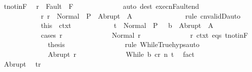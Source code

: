\begin{isabellebody}
\ t{\isacharunderscore}notin{\isacharunderscore}F\ \isamarkupfalse%
\ {\isachardoublequoteopen}r\ {\isasymnotin}\ Fault\ {\isacharbackquote}\ F{\isachardoublequoteclose}\isanewline
\ \ \ \ \ \ \ \ \ \ \ \ \isamarkupfalse%
\ {\isacharparenleft}auto\ dest{\isacharcolon}\ execn{\isacharunderscore}Fault{\isacharunderscore}end{\isacharparenright}\isanewline
\ \ \ \ \ \ \ \ \ \ \isamarkupfalse%
\isanewline
\ \ \ \ \ \ \ \ \ \ \isamarkupfalse%
\ r{\isacharcolon}\ {\isachardoublequoteopen}r\ {\isasymin}\ Normal\ {\isacharbackquote}\ P\ {\isasymunion}\ Abrupt\ {\isacharbackquote}\ A{\isachardoublequoteclose}\isanewline
\ \ \ \ \ \ \ \ \ \ \ \ \isamarkupfalse%
\ {\isacharminus}\ {\isacharparenleft}rule\ cnvalidD{\isacharcomma}auto{\isacharparenright}\isanewline
\ \ \ \ \ \ \ \ \ \ \isamarkupfalse%
\ this\ {\isacharunderscore}\ ctxt\isanewline
\ \ \ \ \ \ \ \ \ \ \isamarkupfalse%
\ {\isachardoublequoteopen}t\ {\isasymin}\ Normal\ {\isacharbackquote}\ {\isacharparenleft}P\ {\isasyminter}\ {\isacharminus}\ b{\isacharparenright}\ {\isasymunion}\ Abrupt\ {\isacharbackquote}\ A\ {\isachardoublequoteclose}\isanewline
\ \ \ \ \ \ \ \ \ \ \isamarkupfalse%
\ {\isacharparenleft}cases\ r{\isacharparenright}\isanewline
\ \ \ \ \ \ \ \ \ \ \ \ \isamarkupfalse%
\ {\isacharparenleft}Normal\ r{\isacharprime}{\isacharparenright}\isanewline
\ \ \ \ \ \ \ \ \ \ \ \ \isamarkupfalse%
\ r\ ctxt\ eqs\ t{\isacharunderscore}notin{\isacharunderscore}F\isanewline
\ \ \ \ \ \ \ \ \ \ \ \ \isamarkupfalse%
\ {\isacharquery}thesis\isanewline
\ \ \ \ \ \ \ \ \ \ \ \ \ \ \isamarkupfalse%
\ {\isacharminus}\ {\isacharparenleft}rule\ WhileTrue{\isachardot}hyps{\isacharcomma}auto{\isacharparenright}\isanewline
\ \ \ \ \ \ \ \ \ \ \isamarkupfalse%
\isanewline
\ \ \ \ \ \ \ \ \ \ \ \ \isamarkupfalse%
\ {\isacharparenleft}Abrupt\ r{\isacharprime}{\isacharparenright}\isanewline
\ \ \ \ \ \ \ \ \ \ \ \ \isamarkupfalse%
\ {\isachardoublequoteopen}{\isasymGamma}{\isasymturnstile}{\isasymlangle}While\ b{\isacharprime}\ c{\isacharprime}{\isacharcomma}r{\isasymrangle}\ {\isacharequal}n{\isasymRightarrow}\ t{\isachardoublequoteclose}\ \isamarkupfalse%
\ fact\isanewline
\ \ \ \ \ \ \ \ \ \ \ \ \isamarkupfalse%
\ Abrupt\ \isamarkupfalse%
\ {\isachardoublequoteopen}t{\isacharequal}r{\isachardoublequoteclose}\isanewline

\end{isabellebody}
